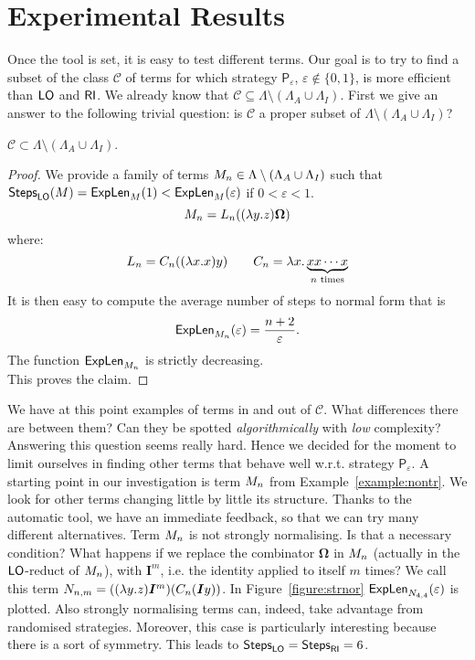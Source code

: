 \section{Experimental Results}
Once the tool is set, it is easy to test different terms. Our goal is to try to find a subset of the class $\mathcal{C}$ of terms for which strategy $\mathsf{P}_\varepsilon$, $\varepsilon\not\in\{0,1\}$, is more efficient than $\textsf{LO}$ and $\textsf{RI}$. We already know that $\mathcal{C}\subseteq\Lambda\setminus(\Lambda_A\cup\Lambda_I)$. First we give an answer to the following trivial question: is $\mathcal{C}$ a proper subset of $\Lambda\setminus(\Lambda_A\cup\Lambda_I)$?
\begin{proposition}\label{prop:strict}
	$\mathcal{C}\subset\Lambda\setminus(\Lambda_A\cup\Lambda_I)$.
\end{proposition}
\begin{proof}
	We provide a family of terms $M_n\in\Lambda\setminus(\Lambda_A\cup\Lambda_I)$ such that $\textsf{Steps}_{\textsf{LO}}(M)=\textsf{ExpLen}_{M}(1)<\textsf{ExpLen}_{M}(\varepsilon)$ if $0<\varepsilon<1$.
	$$
	M_n=L_n((\lambda y.z)\bm{\Omega})
	$$
	where:
	$$
	L_n = C_n((\lambda x.x)y)\qquad
	C_n = \lambda  x.\underbrace{xx\cdots x}_{n\text{ times}}
	$$
	It is then easy to compute the average number of steps to normal form that is
	$$
	\textsf{ExpLen}_{M_n}(\varepsilon)=\frac{n+2}{\varepsilon}.
	$$ 
	The function $\textsf{ExpLen}_{M_n}$ is strictly decreasing.\\
	This proves the claim.
\end{proof}
We have at this point examples of terms in and out of $\mathcal{C}$. What differences there are between them? Can they be spotted \emph{algorithmically} with \emph{low} complexity? Answering this question seems really hard. Hence we decided for the moment to limit ourselves in finding other terms that behave well w.r.t. strategy $\mathsf{P}_\varepsilon$. A starting point in our investigation is term $M_n$ from Example~\ref{example:nontr}. We look for other terms changing little by little its structure. Thanks to the automatic tool, we have an immediate feedback, so that we can try many different alternatives. Term $M_n$ is not strongly normalising. Is that a necessary condition? What happens if we replace the combinator $\bm{\Omega}$ in $M_n$ (actually in the $\textsf{LO}$-reduct of $M_n$), with $\mathbf{I}^m$, i.e. the identity applied to itself $m$ times? We call this term $N_{n,m}=((\lambda y.z)\bm{I}^m) (C_n(\bm{I}y))$. In Figure~\ref{figure:strnor} $\textsf{ExpLen}_{N_{4,4}}(\varepsilon)$ is plotted. Also strongly normalising terms can, indeed, take advantage from randomised strategies. Moreover, this case is particularly interesting because there is a sort of symmetry. This leads to $\textsf{Steps}_{\textsf{LO}}=\textsf{Steps}_{\textsf{RI}}=6$.

